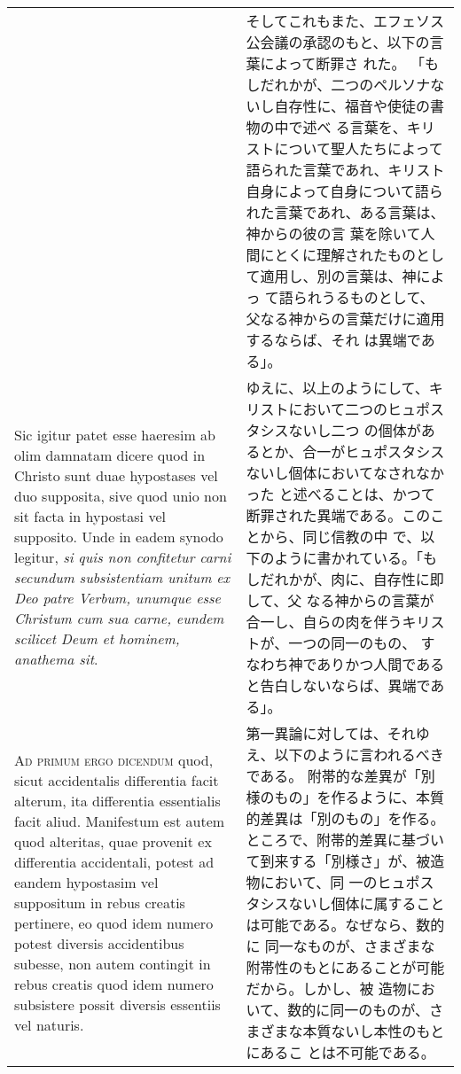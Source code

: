 \documentclass[10pt]{jsarticle} %
\begin{document}
\begin{longtable}{p{21em}p{21em}}
&

そしてこれもまた、エフェソス公会議の承認のもと、以下の言葉によって断罪さ
 れた。
「もしだれかが、二つのペルソナないし自存性に、福音や使徒の書物の中で述べ
 る言葉を、キリストについて聖人たちによって語られた言葉であれ、キリスト
 自身によって自身について語られた言葉であれ、ある言葉は、神からの彼の言
 葉を除いて人間にとくに理解されたものとして適用し、別の言葉は、神によっ
 て語られうるものとして、父なる神からの言葉だけに適用するならば、それ
 は異端である」。

\\


Sic
igitur patet esse haeresim ab olim damnatam dicere quod in Christo sunt
duae hypostases vel duo supposita, sive quod unio non sit facta in
hypostasi vel supposito. Unde in eadem synodo legitur, {\itshape si quis non
confitetur carni secundum subsistentiam unitum ex Deo patre Verbum,
unumque esse Christum cum sua carne, eundem scilicet Deum et hominem,
anathema sit}.

&

ゆえに、以上のようにして、キリストにおいて二つのヒュポスタシスないし二つ
 の個体があるとか、合一がヒュポスタシスないし個体においてなされなかった
 と述べることは、かつて断罪された異端である。このことから、同じ信教の中
 で、以下のように書かれている。「もしだれかが、肉に、自存性に即して、父
 なる神からの言葉が合一し、自らの肉を伴うキリストが、一つの同一のもの、
 すなわち神でありかつ人間であると告白しないならば、異端である」。


\\





{\scshape Ad primum ergo dicendum} quod, sicut accidentalis differentia facit
alterum, ita differentia essentialis facit aliud. Manifestum est autem
quod alteritas, quae provenit ex differentia accidentali, potest ad
eandem hypostasim vel suppositum in rebus creatis pertinere, eo quod
idem numero potest diversis accidentibus subesse, non autem contingit in
rebus creatis quod idem numero subsistere possit diversis essentiis vel
naturis. 


&

第一異論に対しては、それゆえ、以下のように言われるべきである。
附帯的な差異が「別様のもの」を作るように、本質的差異は「別のもの」を作る。
 ところで、附帯的差異に基づいて到来する「別様さ」が、被造物において、同
 一のヒュポスタシスないし個体に属することは可能である。なぜなら、数的に
 同一なものが、さまざまな附帯性のもとにあることが可能だから。しかし、被
 造物において、数的に同一のものが、さまざまな本質ないし本性のもとにあるこ
 とは不可能である。


\end{longtable}
\end{document}

